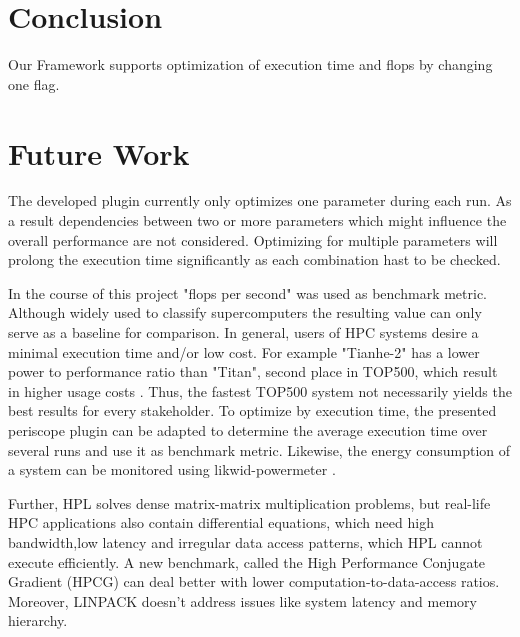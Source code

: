 \documentclass[10pt,twocolumn]{article}
\begin{document}
\section{Conclusion}
\label{sec:conclusion}
Our Framework supports optimization of execution time and flops by changing one flag.


\section{Future Work}
\label{sec:futureWork}
The developed plugin currently only optimizes one parameter during each run. As a result dependencies between two or more parameters which might influence the overall performance are not considered. Optimizing for multiple parameters will prolong the execution time significantly as each combination hast to be checked.

In the course of this project "flops per second" was used as benchmark metric. Although widely used to classify supercomputers the resulting value can only serve as a baseline for comparison. In general, users of HPC systems desire a minimal execution time and/or low cost. For example "Tianhe-2" has a lower power to performance ratio than "Titan", second place in TOP500, which result in higher usage costs \cite{top500}. Thus, the fastest TOP500 system not necessarily yields the best results for every stakeholder. To optimize by execution time, the presented periscope plugin can be adapted to determine the average execution time over several runs and use it as benchmark metric. Likewise, the energy consumption of a system can be monitored using likwid-powermeter \cite{likwidLRZ,likwidPowermeter}.

Further, HPL solves dense matrix-matrix multiplication problems, but real-life HPC applications also contain differential equations, which need high bandwidth,low latency and irregular data access patterns, which HPL cannot execute efficiently. A new benchmark, called the High Performance Conjugate Gradient (HPCG) can deal better with lower computation-to-data-access ratios\cite{betterLinpack}. Moreover, LINPACK doesn't address issues like system latency and memory hierarchy. 

\end{document}
